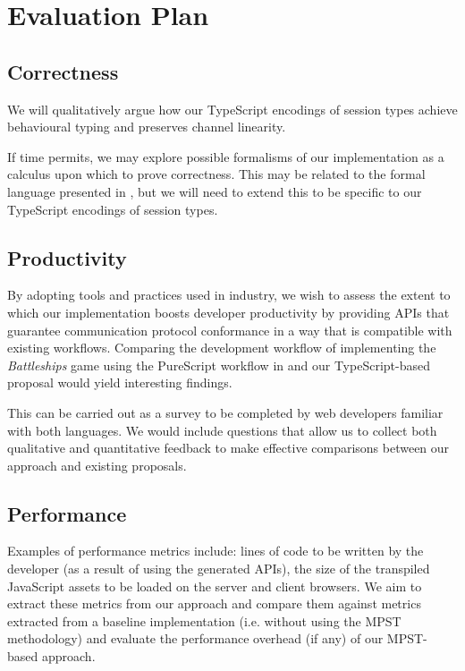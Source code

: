 
\chapter{Evaluation Plan}

\section{Correctness}
We will qualitatively argue how our TypeScript encodings of session types achieve behavioural typing and preserves channel linearity.

If time permits, we may explore possible formalisms of our implementation as a calculus upon which to prove correctness. This may be related to the formal language presented in \cite{UnderstandingTypeScript}, but we will need to extend this to be specific to our TypeScript encodings of session types.

\section{Productivity} 
By adopting tools and practices used in industry, we wish to assess the extent to which our implementation boosts developer productivity by providing APIs that guarantee communication protocol conformance in a way that is compatible with existing workflows. Comparing the development workflow of implementing the \textit{Battleships} game using the PureScript workflow in \cite{PureScript2019} and our TypeScript-based proposal would yield interesting findings.

This can be carried out as a survey to be completed by web developers familiar with both languages. We would include questions that allow us to collect both qualitative and quantitative feedback to make effective comparisons between our approach and existing proposals.

\section{Performance} Examples of performance metrics include: lines of code to be written by the developer (as a result of using the generated APIs), the size of the transpiled JavaScript assets to be loaded on the server and client browsers. We aim to extract these metrics from our approach and compare them against metrics extracted from a baseline implementation (i.e. without using the MPST methodology) and evaluate the performance overhead (if any) of our MPST-based approach.
